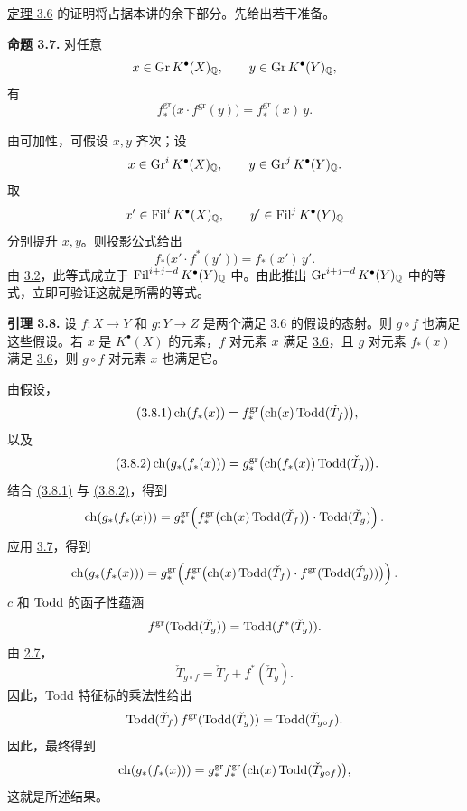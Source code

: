 
\hyperlink{sga6.e08.thm.3-6}{定理 3.6} 的证明将占据本讲的余下部分。先给出若干准备。

\textbf{命题 3.7.} 对任意
\[
x\in \operatorname{Gr} K^{\bullet}(X)_{\mathbb Q},\qquad
y\in \operatorname{Gr} K^{\bullet}(Y)_{\mathbb Q},
\]
有
\[
 f^{\mathrm{gr}}_*\bigl(x\cdot f^{\mathrm{gr}}(y)\bigr)
 =
 f^{\mathrm{gr}}_*(x)\,y .
\]

由可加性，可假设 \(x,y\) 齐次；设
\[
x\in \operatorname{Gr}^iK^{\bullet}(X)_{\mathbb Q},\qquad
y\in \operatorname{Gr}^jK^{\bullet}(Y)_{\mathbb Q}.
\]
取
\[
x'\in \operatorname{Fil}^iK^{\bullet}(X)_{\mathbb Q},\qquad
y'\in \operatorname{Fil}^jK^{\bullet}(Y)_{\mathbb Q}
\]
分别提升 \(x,y\)。则投影公式给出
\[
 f_*\bigl(x'\cdot f^*(y')\bigr)=f_*(x')\,y'.
\]
由 \hyperlink{sga6.e08.prop.3-2}{3.2}，此等式成立于
\(\operatorname{Fil}^{i+j-d}K^{\bullet}(Y)_{\mathbb Q}\) 中。由此推出
\(\operatorname{Gr}^{i+j-d}K^{\bullet}(Y)_{\mathbb Q}\) 中的等式，立即可验证这就是所需的等式。

\textbf{引理 3.8.} 设 \(f:X\to Y\) 和 \(g:Y\to Z\) 是两个满足 3.6 的假设的态射。则 \(g\circ f\) 也满足这些假设。若 \(x\) 是 \(K^{\bullet}(X)\) 的元素，\(f\) 对元素 \(x\) 满足 \hyperlink{sga6.e08.thm.3-6}{3.6}，且 \(g\) 对元素 \(f_*(x)\) 满足 \hyperlink{sga6.e08.thm.3-6}{3.6}，则 \(g\circ f\) 对元素 \(x\) 也满足它。

由假设，
\begin{equation}\tag{3.8.1}
 \operatorname{ch}(f_*(x))=
 f^{\mathrm{gr}}_*\bigl(\operatorname{ch}(x)\operatorname{Todd}(\check T_f)\bigr),
\end{equation}
以及
\begin{equation}\tag{3.8.2}
 \operatorname{ch}(g_*(f_*(x)))=
 g^{\mathrm{gr}}_*\bigl(\operatorname{ch}(f_*(x))\operatorname{Todd}(\check T_g)\bigr).
\end{equation}
结合 \hyperlink{sga6.e08.eq.3-8-1}{(3.8.1)} 与 \hyperlink{sga6.e08.eq.3-8-2}{(3.8.2)}，得到
\[
\operatorname{ch}(g_*(f_*(x)))=
g^{\mathrm{gr}}_*\!\left(
 f^{\mathrm{gr}}_*\bigl(\operatorname{ch}(x)\operatorname{Todd}(\check T_f)\bigr)\cdot \operatorname{Todd}(\check T_g)
\right).
\]
应用 \hyperlink{sga6.e08.prop.3-7}{3.7}，得到
\[
\operatorname{ch}(g_*(f_*(x)))=
g^{\mathrm{gr}}_*\!\left(
 f^{\mathrm{gr}}_*\bigl(\operatorname{ch}(x)\operatorname{Todd}(\check T_f)\cdot
 f^{\mathrm{gr}}(\operatorname{Todd}(\check T_g))\bigr)
\right).
\]
\(c\) 和 \(\operatorname{Todd}\) 的函子性蕴涵
\[
 f^{\mathrm{gr}}(\operatorname{Todd}(\check T_g))=\operatorname{Todd}(f^*(\check T_g)).
\]
由 \hyperlink{sga6.e08.cor.2-7}{2.7}，
\[
 \check T_{g\circ f}=\check T_f+f^*(\check T_g).
\]
因此，Todd 特征标的乘法性给出
\[
 \operatorname{Todd}(\check T_f)\,f^{\mathrm{gr}}(\operatorname{Todd}(\check T_g))
 =
 \operatorname{Todd}(\check T_{g\circ f}).
\]
因此，最终得到
\[
 \operatorname{ch}(g_*(f_*(x)))=
 g^{\mathrm{gr}}_* f^{\mathrm{gr}}_*\bigl(\operatorname{ch}(x)\operatorname{Todd}(\check T_{g\circ f})\bigr),
\]
这就是所述结果。

